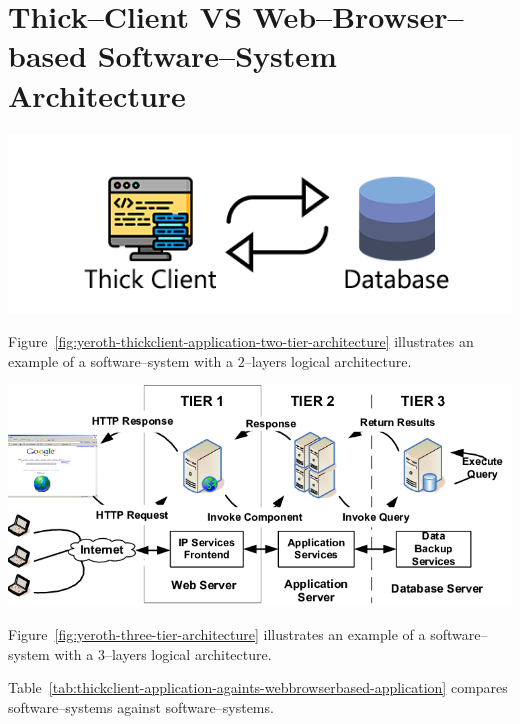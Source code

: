 \chapter{Thick--Client VS Web--Browser--based
	Software--System Architecture}



\begin{center}
\includegraphics[scale=0.52]{images/yeroth-thickclient-application-two-tier-architecture.png}
\label{fig:yeroth-thickclient-application-two-tier-architecture}
\end{center}

Figure~\ref{fig:yeroth-thickclient-application-two-tier-architecture}
illustrates an example of a \thickclient
software--system with a $2$--layers
logical architecture.

\begin{center}
\includegraphics[scale=0.39]{images/yeroth-three-tier-architecture.png}
\label{fig:yeroth-three-tier-architecture}
\end{center}

Figure~\ref{fig:yeroth-three-tier-architecture}
illustrates an example of a \webbrowserbased
software--system with a $3$--layers
logical architecture.

Table~\ref{tab:thickclient-application-againts-webbrowserbased-application}
compares \thickclient software--systems against
\webbrowserbased software--systems.